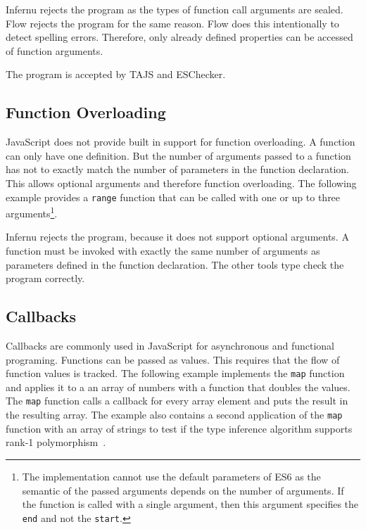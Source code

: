 
Infernu rejects the program as the types of function call arguments are sealed. Flow rejects the program for the same reason. Flow does this intentionally to detect spelling errors. Therefore, only already defined properties can be accessed of function arguments. 

The program is accepted by TAJS and ESChecker.

\subsection{Function Overloading}
JavaScript does not provide built in support for function overloading. A function can only have one definition. But the number of arguments passed to a function has not to exactly match the number of parameters in the function declaration. This allows optional arguments and therefore function overloading. The following example provides a \texttt{range} function that can be called with one or up to three arguments\footnote{The implementation cannot use the default parameters of ES6 as the semantic of the passed arguments depends on the number of arguments. If the function is called with a single argument, then this argument specifies the \texttt{end} and not the \texttt{start}.}. 


Infernu rejects the program, because it does not support optional arguments. A function must be invoked with exactly the same number of arguments as parameters defined in the function declaration. The other tools type check the program correctly.

\subsection{Callbacks}
Callbacks are commonly used in JavaScript for asynchronous and functional programing. Functions can be passed as values. This requires that the flow of function values is tracked. The following example implements the \texttt{map} function and applies it to a an array of numbers with a function that doubles the values. The \texttt{map} function calls a callback for every array element and puts the result in the resulting array. The example also contains a second application of the \texttt{map} function with an array of strings to test if the type inference algorithm supports rank-1 polymorphism~\cite{Pierce2002}.

